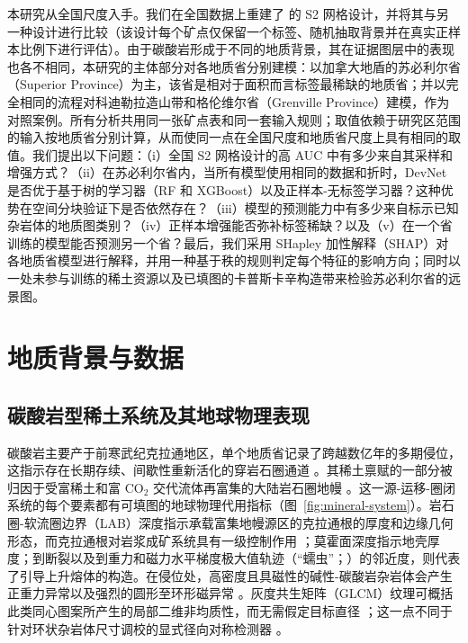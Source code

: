 \documentclass[pdflatex,sn-apa]{sn-jnl}
\begin{document}
本研究从全国尺度入手。我们在全国数据上重建了 \citet{Parsa2024} 的 S2 网格设计，并将其与另一种设计进行比较（该设计每个矿点仅保留一个标签、随机抽取背景并在真实正样本比例下进行评估）。由于碳酸岩形成于不同的地质背景，其在证据图层中的表现也各不相同，本研究的主体部分对各地质省分别建模：以加拿大地盾的苏必利尔省（Superior Province）为主，该省是相对于面积而言标签最稀缺的地质省；并以完全相同的流程对科迪勒拉造山带和格伦维尔省（Grenville Province）建模，作为对照案例。所有分析共用同一张矿点表和同一套输入规则；取值依赖于研究区范围的输入按地质省分别计算，从而使同一点在全国尺度和地质省尺度上具有相同的取值。我们提出以下问题：（i）全国 S2 网格设计的高 AUC 中有多少来自其采样和增强方式？（ii）在苏必利尔省内，当所有模型使用相同的数据和折时，DevNet 是否优于基于树的学习器（RF 和 XGBoost）以及正样本-无标签学习器？这种优势在空间分块验证下是否依然存在？（iii）模型的预测能力中有多少来自标示已知杂岩体的地质图类别？（iv）正样本增强能否弥补标签稀缺？以及（v）在一个省训练的模型能否预测另一个省？最后，我们采用 SHapley 加性解释（SHAP）对各地质省模型进行解释，并用一种基于秩的规则判定每个特征的影响方向；同时以一处未参与训练的稀土资源以及已填图的卡普斯卡辛构造带来检验苏必利尔省的远景图。

\section{地质背景与数据}\label{sec:data}

\subsection{碳酸岩型稀土系统及其地球物理表现}\label{sec:mineral-system}

碳酸岩主要产于前寒武纪克拉通地区，单个地质省记录了跨越数亿年的多期侵位，这指示存在长期存续、间歇性重新活化的穿岩石圈通道 \citep{Woolley2012}。其稀土禀赋的一部分被归因于受富稀土和富 CO$_2$ 交代流体再富集的大陆岩石圈地幔 \citep{Hou2023,Yaxley2021}。这一源-运移-圈闭系统的每个要素都有可填图的地球物理代用指标（图~\ref{fig:mineral-system}）。岩石圈-软流圈边界（LAB）深度指示承载富集地幔源区的克拉通根的厚度和边缘几何形态，而克拉通根对岩浆成矿系统具有一级控制作用 \citep{Griffin2013,Groves2021,Hoggard2020}；莫霍面深度指示地壳厚度；到断裂以及到重力和磁力水平梯度极大值轨迹（“蠕虫”；\citealp{Hornby1999}）的邻近度，则代表了引导上升熔体的构造。在侵位处，高密度且具磁性的碱性-碳酸岩杂岩体会产生正重力异常以及强烈的圆形至环形磁异常 \citep{Thomas2016,Drenth2014}。灰度共生矩阵（GLCM）纹理可概括此类同心图案所产生的局部二维非均质性，而无需假定目标直径 \citep{Cooper2005,HallBeyer2017}；这一点不同于针对环状杂岩体尺寸调校的显式径向对称检测器 \citep{Aranha2021}。
\end{document}
